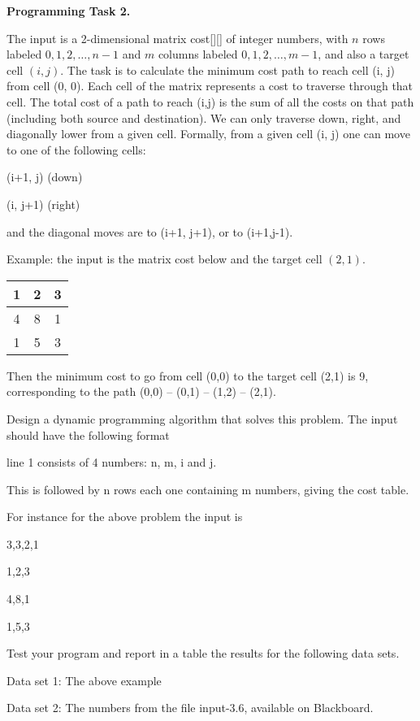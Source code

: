 \documentclass[11pt]{article}
\begin{document}
\textbf{Programming Task 2.}


The input is a 2-dimensional  matrix cost[][] of integer numbers, with $n$ rows labeled $0,1, 2, \ldots, n-1$ and $m$ columns labeled $0,1,2,\ldots, m-1$, and also a target cell $(i,j)$. The task is to calculate the minimum cost path to reach cell (i, j) from cell (0, 0). Each cell of the matrix represents a cost to traverse through that cell. The total cost of a path to reach (i,j) is the sum of all the costs on that path (including both source and destination).
We can only traverse down, right,  and diagonally lower  from a given cell. Formally, from a given cell (i, j) one can move to one of the following cells: 

(i+1, j) (down)


(i, j+1) (right)



 and the diagonal moves are to (i+1, j+1), or to  (i+1,j-1).

\medskip

Example:  the input is the matrix cost below and the target cell $(2,1)$.
\medskip


\begin{tabular}{|c|c|c|}
\hline
1  & 2 & 3 \\
\hline
4 & 8 & 1 \\
\hline
1 & 5 & 3 \\
\hline

\end{tabular}
\medskip

Then the minimum cost to go from cell (0,0) to the target cell (2,1) is 9, corresponding to the path (0,0) -- (0,1) -- (1,2) -- (2,1).


Design a dynamic programming algorithm that solves this problem. The input should have the following format

line 1 consists of 4 numbers: n, m, i and j.

This is followed by n rows each one containing m numbers, giving the cost table.

For instance for the above problem the input is

3,3,2,1

1,2,3

4,8,1

1,5,3


Test your program and report in a table the results for the following data sets.

Data set 1:  The above example

Data set 2:  The  numbers from the file input-3.6, available on Blackboard. 
\end{document}
